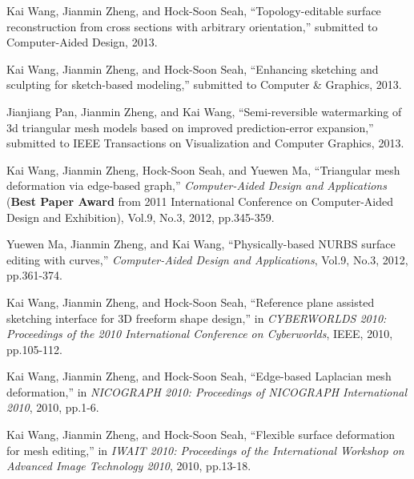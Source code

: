 \begin{enumerate}[ {[}1{]} ]

\item Kai Wang, Jianmin Zheng, and Hock-Soon Seah,
``Topology-editable surface reconstruction from cross sections with
arbitrary orientation,'' submitted to Computer-Aided Design, 2013.

\item Kai Wang, Jianmin Zheng, and Hock-Soon Seah,
``Enhancing sketching and sculpting for sketch-based modeling,'' submitted to
Computer \& Graphics, 2013.

\item Jianjiang Pan, Jianmin Zheng, and Kai Wang,
``Semi-reversible watermarking of 3d triangular mesh models based on
improved prediction-error expansion,'' submitted to
IEEE Transactions on Visualization and Computer Graphics, 2013.

\item Kai Wang, Jianmin Zheng, Hock-Soon Seah, and Yuewen
Ma, ``Triangular mesh deformation via edge-based graph,''
\emph{Computer-Aided Design and Applications} ({\bf Best Paper
Award} from 2011 International Conference on Computer-Aided Design
and Exhibition), Vol.9, No.3, 2012, pp.345-359.

\item Yuewen Ma, Jianmin Zheng, and Kai Wang,
``Physically-based NURBS surface editing with curves,''
\emph{Computer-Aided Design and Applications}, Vol.9, No.3, 2012,
pp.361-374.

\item Kai Wang, Jianmin Zheng, and Hock-Soon Seah,
``Reference plane assisted sketching interface for 3D freeform shape
design,'' in \emph{CYBERWORLDS 2010: Proceedings of the 2010
International Conference on Cyberworlds}, IEEE, 2010, pp.105-112.

\item Kai Wang, Jianmin Zheng, and Hock-Soon Seah,
``Edge-based Laplacian mesh deformation,'' in \emph{NICOGRAPH 2010:
Proceedings of NICOGRAPH International 2010}, 2010, pp.1-6.

\item Kai Wang, Jianmin Zheng, and Hock-Soon Seah,
``Flexible surface deformation for mesh editing,'' in \emph{IWAIT
2010: Proceedings of the International Workshop on Advanced Image
Technology 2010}, 2010, pp.13-18.

\end{enumerate}
